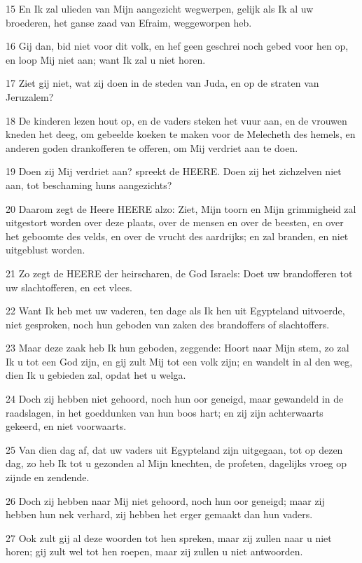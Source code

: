 \par 15 En Ik zal ulieden van Mijn aangezicht wegwerpen, gelijk als Ik al uw broederen, het ganse zaad van Efraim, weggeworpen heb.
\par 16 Gij dan, bid niet voor dit volk, en hef geen geschrei noch gebed voor hen op, en loop Mij niet aan; want Ik zal u niet horen.
\par 17 Ziet gij niet, wat zij doen in de steden van Juda, en op de straten van Jeruzalem?
\par 18 De kinderen lezen hout op, en de vaders steken het vuur aan, en de vrouwen kneden het deeg, om gebeelde koeken te maken voor de Melecheth des hemels, en anderen goden drankofferen te offeren, om Mij verdriet aan te doen.
\par 19 Doen zij Mij verdriet aan? spreekt de HEERE. Doen zij het zichzelven niet aan, tot beschaming huns aangezichts?
\par 20 Daarom zegt de Heere HEERE alzo: Ziet, Mijn toorn en Mijn grimmigheid zal uitgestort worden over deze plaats, over de mensen en over de beesten, en over het geboomte des velds, en over de vrucht des aardrijks; en zal branden, en niet uitgeblust worden.
\par 21 Zo zegt de HEERE der heirscharen, de God Israels: Doet uw brandofferen tot uw slachtofferen, en eet vlees.
\par 22 Want Ik heb met uw vaderen, ten dage als Ik hen uit Egypteland uitvoerde, niet gesproken, noch hun geboden van zaken des brandoffers of slachtoffers.
\par 23 Maar deze zaak heb Ik hun geboden, zeggende: Hoort naar Mijn stem, zo zal Ik u tot een God zijn, en gij zult Mij tot een volk zijn; en wandelt in al den weg, dien Ik u gebieden zal, opdat het u welga.
\par 24 Doch zij hebben niet gehoord, noch hun oor geneigd, maar gewandeld in de raadslagen, in het goeddunken van hun boos hart; en zij zijn achterwaarts gekeerd, en niet voorwaarts.
\par 25 Van dien dag af, dat uw vaders uit Egypteland zijn uitgegaan, tot op dezen dag, zo heb Ik tot u gezonden al Mijn knechten, de profeten, dagelijks vroeg op zijnde en zendende.
\par 26 Doch zij hebben naar Mij niet gehoord, noch hun oor geneigd; maar zij hebben hun nek verhard, zij hebben het erger gemaakt dan hun vaders.
\par 27 Ook zult gij al deze woorden tot hen spreken, maar zij zullen naar u niet horen; gij zult wel tot hen roepen, maar zij zullen u niet antwoorden.
